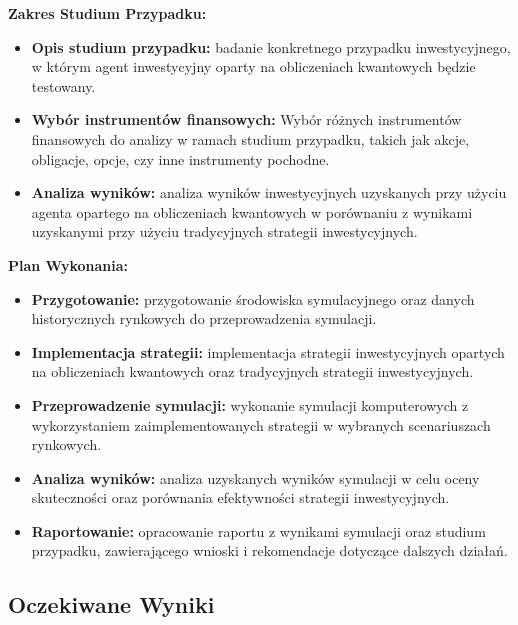 \documentclass[polish,envcountsect,10pt]{article}
\begin{document}
\noindent\textbf{Zakres Studium Przypadku:}
\begin{itemize}
	\item \textbf{Opis studium przypadku:} badanie konkretnego przypadku inwestycyjnego, w którym agent inwestycyjny oparty na obliczeniach kwantowych będzie testowany.
    
	\item \textbf{Wybór instrumentów finansowych:} Wybór różnych instrumentów finansowych do analizy w ramach studium przypadku, takich jak akcje, obligacje, opcje, czy inne instrumenty pochodne.
    
	\item \textbf{Analiza wyników:} analiza wyników inwestycyjnych uzyskanych przy użyciu agenta opartego na obliczeniach kwantowych w porównaniu z wynikami uzyskanymi przy użyciu tradycyjnych strategii inwestycyjnych.
\end{itemize}

\noindent\textbf{Plan Wykonania:}
\begin{itemize}
	\item \textbf{Przygotowanie:} przygotowanie środowiska symulacyjnego oraz danych historycznych rynkowych do przeprowadzenia symulacji.
    
	\item \textbf{Implementacja strategii:} implementacja strategii inwestycyjnych opartych na obliczeniach kwantowych oraz tradycyjnych strategii inwestycyjnych.
    
	\item \textbf{Przeprowadzenie symulacji:} wykonanie symulacji komputerowych z wykorzystaniem zaimplementowanych strategii w wybranych scenariuszach rynkowych.
    
	\item \textbf{Analiza wyników:} analiza uzyskanych wyników symulacji w celu oceny skuteczności oraz porównania efektywności strategii inwestycyjnych.
    
	\item \textbf{Raportowanie:} opracowanie raportu z wynikami symulacji oraz studium przypadku, zawierającego wnioski i rekomendacje dotyczące dalszych działań.
\end{itemize}

\subsection{Oczekiwane Wyniki}
\end{document}

